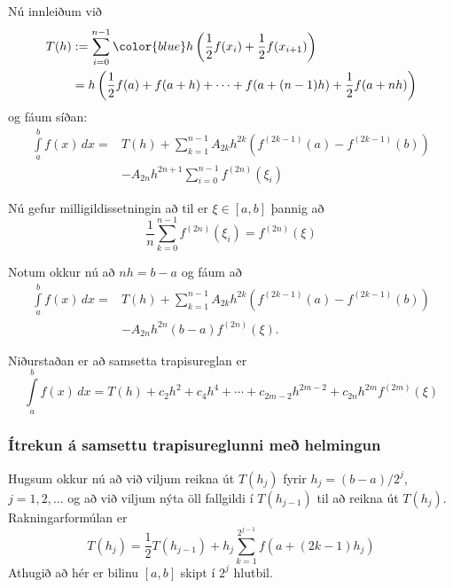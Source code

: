 \documentclass[icelandic,a4paper,12pt]{article}
\begin{document}

Nú innleiðum við
\begin{align*}
  T(h) 
  &:= \sum_{i=0}^{n-1}
  {\color{blue} h \left( \frac{1}{2} f(x_i) + 
  \frac{1}{2}f(x_{i+1}) \right)}\\
  &= h\left( \frac{1}{2}f(a) + f(a+h) 
    + \cdots + f(a+(n-1)h) + \frac{1}{2}f(a+nh)\right)
\end{align*}
\pause
og fáum síðan:
\begin{align*}
  \int\limits_a^b f(x)\, dx 
  = & T(h) + \sum_{k=1}^{n-1}A_{2k}h^{2k} 
  \left( f^{(2k-1)}(a) - f^{(2k-1)}(b) \right) \\
  & - A_{2n}h^{2n+1} \sum_{i=0}^{n-1} f^{(2n)}(\xi_i)
\end{align*}



Nú gefur milligildissetningin að til er $\xi \in [a,b]$ þannig að
\begin{equation*}
  \frac{1}{n} \sum\limits_{k=0}^{n-1} f^{(2n)}(\xi_i)
  = f^{(2n)}(\xi)
\end{equation*}

Notum okkur nú að $nh = b-a$ og fáum að
\begin{align*}
  \int\limits_a^b f(x) \, dx 
  = & T(h) + \sum_{k=1}^{n-1}A_{2k}h^{2k} 
  \left( f^{(2k-1)}(a) - f^{(2k-1)}(b) \right) \\
  & - A_{2n} h^{2n}(b-a)f^{(2n)}(\xi).
\end{align*}

\pause
Niðurstaðan er að samsetta trapisureglan er
\begin{equation*}
  \int\limits_a^b f(x) \, dx 
  = T(h) + c_2h^2 + c_4h^4 + \cdots + c_{2m-2}h^{2m-2} 
  + c_{2n}h^{2m}f^{(2m)}(\xi)
\end{equation*}



\subsubsection{Ítrekun á samsettu trapisureglunni með helmingun} 
Hugsum okkur nú að við viljum reikna út $T(h_j)$ fyrir $h_j =(b-a)/
2^j$, $j = 1,2,\ldots$ og að við viljum nýta öll fallgildi í
$T(h_{j-1})$  til að reikna út $T(h_j)$. Rakningarformúlan er 
\begin{equation*}
  T(h_j) = \frac{1}{2} T(h_{j-1}) + h_j \sum_{k=1}^{2^{j-1}} f(a+(2k-1)h_j)
\end{equation*}
Athugið að hér er bilinu $[a,b]$ skipt í $2^j$ hlutbil.
\end{document}
